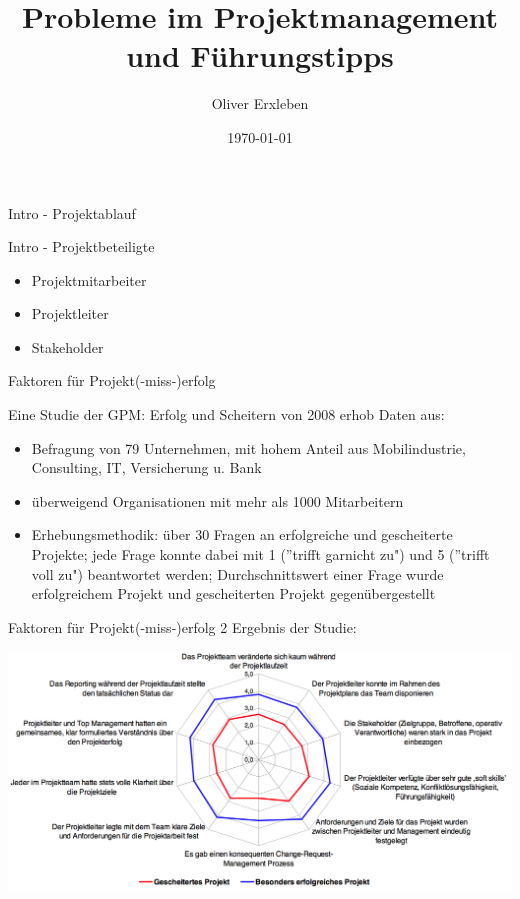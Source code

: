 \documentclass[12pt]{beamer}
\title{Probleme im Projektmanagement und Führungstipps}
\author{Oliver Erxleben}
\institute{Hochschule Osnabrück}
\date{\today}
\begin{document}
	\thispagestyle{empty}
	\frame{\titlepage}
		
	\begin{frame}{Intro - Projektablauf}
		
	\end{frame}

	\begin{frame}{Intro - Projektbeteiligte}
	
		\begin{itemize}
			\item{Projektmitarbeiter}
			\item{Projektleiter}
			\item{Stakeholder}
		\end{itemize}

	
	\end{frame}
	
	\thispagestyle{empty}
	
	\begin{frame}{Faktoren für Projekt(-miss-)erfolg}
		
		Eine Studie der GPM: Erfolg und Scheitern von 2008 erhob Daten aus: 
		\begin{itemize}
			\item{Befragung von 79 Unternehmen, mit hohem Anteil aus Mobilindustrie, Consulting, IT, Versicherung u. Bank }
			\item{überweigend Organisationen mit mehr als 1000 Mitarbeitern}
			\item{Erhebungsmethodik: über 30 Fragen an erfolgreiche und gescheiterte Projekte; jede Frage konnte dabei mit 1 (''trifft garnicht zu") und 5 (''trifft voll zu") beantwortet werden; Durchschnittswert einer Frage wurde erfolgreichem Projekt und gescheiterten Projekt gegenübergestellt}
		\end{itemize}

	\end{frame}

	\begin{frame}{Faktoren für Projekt(-miss-)erfolg 2}
	Ergebnis der Studie:
		\begin{center}
			\includegraphics[width=1\textwidth]{images/studie_erfolgsfaktoren}
		\end{center}

	\end{frame}
\end{document}
